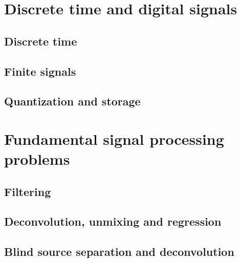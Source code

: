 \section{Discrete time and digital signals}
\label{sec:def_disrete_signal}

\subsection{Discrete time}

\subsection{Finite signals}
\label{sec:finite}

\subsection{Quantization and storage}
\label{sec:}


\section{Fundamental signal processing problems}
\label{sec:sp_prob}

\subsection{Filtering}


\subsection{Deconvolution, unmixing and regression}


\subsection{Blind source separation and deconvolution}



